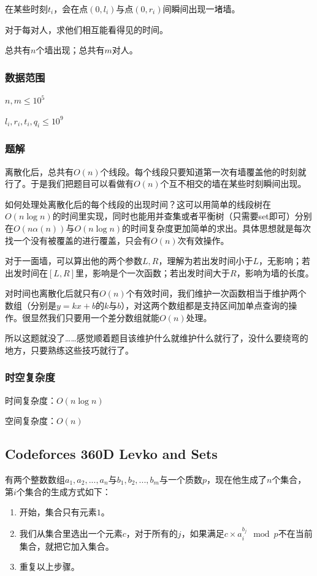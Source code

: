 \documentclass{ctexart}
\begin{document}
在某些时刻$t_i$，会在点$(0,l_i)$与点$(0,r_i)$间瞬间出现一堵墙。

对于每对人，求他们相互能看得见的时间。

总共有$n$个墙出现；总共有$m$对人。
\subsubsection{数据范围}
$n,m \le 10^5$

$l_i,r_i,t_i,q_i \le 10^9$
\subsubsection{题解}
离散化后，总共有$O(n)$个线段。每个线段只要知道第一次有墙覆盖他的时刻就行了。于是我们把题目可以看做有$O(n)$个互不相交的墙在某些时刻瞬间出现。

如何处理处离散化后的每个线段的出现时间？这可以用简单的线段树在$O(n \log n)$的时间里实现，同时也能用并查集或者平衡树（只需要set即可）分别在$O(n\alpha(n))$与$O(n \log n)$的时间复杂度更加简单的求出。具体思想就是每次找一个没有被覆盖的进行覆盖，只会有$O(n)$次有效操作。

对于一面墙，可以算出他的两个参数$L,R$，理解为若出发时间小于$L$，无影响；若出发时间在$[L,R]$里，影响是个一次函数；若出发时间大于$R$，影响为墙的长度。

对时间也离散化后就只有$O(n)$个有效时间，我们维护一次函数相当于维护两个数组（分别是$y=kx+b$的$k$与$b$），对这两个数组都是支持区间加单点查询的操作。很显然我们只要用一个差分数组就能$O(n)$处理。

所以这题就没了……感觉顺着题目该维护什么就维护什么就行了，没什么要绕弯的地方，只要熟练这些技巧就行了。
\subsubsection{时空复杂度}
时间复杂度：$O(n \log n)$

空间复杂度：$O(n)$
\subsection{Codeforces 360D Levko and Sets}
有两个整数数组$a_1,a_2,...,a_n$与$b_1,b_2,...,b_m$与一个质数$p$，现在他生成了$n$个集合，第$i$个集合的生成方式如下：

\begin{enumerate}
\item 开始，集合只有元素$1$。
\item 我们从集合里选出一个元素$c$，对于所有的$j$，如果满足$c\times a_i^{b_j} \mod p$不在当前集合，就把它加入集合。
\item 重复以上步骤。
\end{enumerate}
\end{document}
